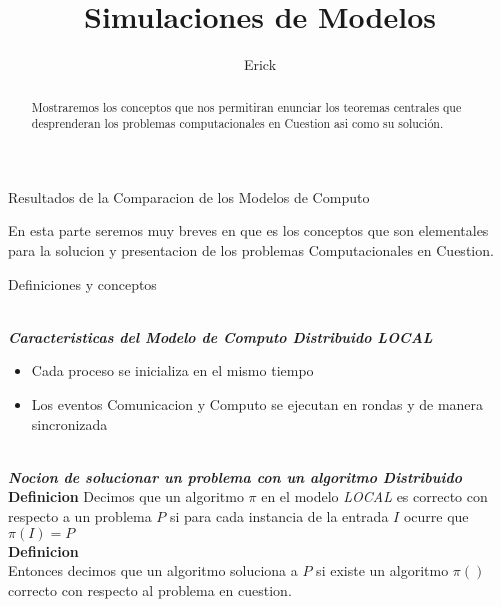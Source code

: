 \documentclass[11pt]{article}
\author{Erick} %
\title{Simulaciones de Modelos}
\begin{document}
    \begin{titlepage}
        \begin{Large}
            Resultados de la Comparacion de los Modelos de Computo
        \end{Large}
    \end{titlepage}

    \begin{abstract}
        Mostraremos los conceptos que nos permitiran enunciar los
        teoremas centrales que desprenderan los problemas computacionales en Cuestion
        asi como su solución.
    \end{abstract}

    En esta parte seremos muy breves en que es los conceptos que son elementales
    para la solucion y presentacion de los problemas Computacionales en Cuestion.
    \\
    \begin{center}
        \begin{Large}
            Definiciones y conceptos
        \end{Large}
    \end{center}
    \\
    \textbf{\emph{Caracteristicas del Modelo de Computo Distribuido LOCAL}}
    \\
    \begin{itemize}
        \item Cada proceso se inicializa en el mismo tiempo
        \item Los eventos Comunicacion y Computo se ejecutan en rondas y de manera sincronizada
    \end{itemize}
    \\
    \textbf{\emph{Nocion de solucionar un problema con un algoritmo Distribuido}}\\
    \textbf{Definicion}
    Decimos que un algoritmo $\pi$  en el modelo \emph{LOCAL} es correcto con respecto a un problema $P$
    si para cada instancia de la entrada $I$ ocurre que  $\pi(I) = P $\\
    \textbf{Definicion}\\
    Entonces decimos que un algoritmo soluciona a $P$ si existe un algoritmo $\pi()$ correcto con
    respecto al problema en cuestion.
    \\
\end{document}
